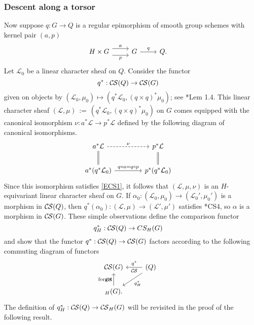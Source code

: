 \documentclass[10pt]{amsart}
\theoremstyle{plain}
\theoremstyle{definition}
\newcommand{\ceq}{{\, :=\, }}
\newcommand{\cs}[1]{{\mathcal{#1}}}
\newcommand{\CS}{{\mathcal{C\hskip-0.8pt S}}}
\begin{document}
\subsubsection{Descent along a torsor}\label{ssec:descent}

Now suppose $q : G \to Q$ is a regular epimorphism of smooth group schemes with kernel pair $(a,p)$
\[
\begin{tikzcd}
H\times G
 \arrow[shift left=2]{r}{a}
  \arrow[shift right=2,swap]{r}{p}
&
G 
\arrow{r}{q}
& 
Q.
\end{tikzcd}
\]
Let $\cs{L}_0$ be a linear character sheaf on $Q$.
Consider the functor
\[
q^* : \CS(Q) \to \CS(G)
\]
given on objects by $(\cs{L}_0,\mu_0) \mapsto (q^*\cs{L}_0, (q\times q)^* \mu_0)$; see \cite{cunningham-roe:13a}*{Lem 1.4}.
This linear character sheaf $(\cs{L},\mu)\ceq (q^*\cs{L}_0, (q\times q)^* \mu_0)$ on $G$ comes equipped with the canonical isomorphism $\nu : a^* \cs{L} \to p^* \cs{L}$ defined by the following diagram of canonical isomorphisms.
\[
\begin{tikzcd}[column sep=40]
a^*\cs{L} \arrow[equal]{d} \arrow[dashed]{r}{\nu} &  \arrow[equal]{d} p^*\cs{L} \\
a^* ( q^*\cs{L}_0) \arrow{r}{q\circ a = q\circ p}
& p^* (q^*\cs{L}_0)
\end{tikzcd}
\]
Since this isomorphism satisfies \eqref{ECS1}, it follows that $(\cs{L}, \mu,\nu)$ is an $H$-equivariant linear character sheaf on $G$.
If $\alpha_0 : (\cs{L}_0,\mu_0) \to (\cs{L}_0',\mu_0')$ is a morphism in $\CS(Q)$, 
then $q^*(\alpha_0) : (\cs{L},\mu) \to (\cs{L}',\mu')$ satisfies \cite{cunningham-roe:13a}*{CS4}, so $\alpha$ is a morphism in $\CS(G)$.
These simple observations define the comparison functor
\[
q_H^* : \CS(Q) \to CS_H(G)
\]
and show that the functor $q^* : \CS(Q) \to \CS(G)$ factors according to the following commuting diagram of functors
\begin{equation}\label{qH}
\begin{tikzcd}
\CS(G) &\arrow{l}[swap]{q^*} 
\CS(Q) \arrow{dl}{q_H^*}\\
\arrow{u}{\text{forget}} \CS_{H}(G). & 
\end{tikzcd}
\end{equation}
The definition of $q_H^* : \CS(Q)\to \CS_H(G)$ will be revisited in the proof of the following result.
\end{document}
